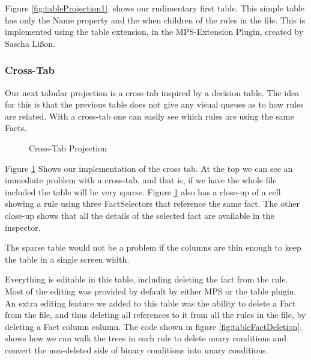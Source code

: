 Figure \ref{fig:tableProjection1}, shows our rudimentary first table.
This simple table has only the Name property and the when children of the rules in the file.
This is implemented using the table extension, in the MPS-Extension Plugin, created by Sascha Lißon.

\subsubsection{Cross-Tab}
Our next tabular projection is a cross-tab inspired by a decision table.
The idea for this is that the previous table does not give any visual queues as to how rules are related.
With a cross-tab one can easily see which rules are using the same Facts.

\begin{figure}[h]
    \centering
    \caption{Cross-Tab Projection}
    \label{fig:crosstabProjection1}
\end{figure}

Figure \ref{fig:crosstabProjection1} Shows our implementation of the cross tab.
At the top we can see an immediate problem with a cross-tab, and that is, if we have the whole file included the table will be very sparse.
Figure \ref{fig:crosstabProjection1} also has a close-up of a cell showing a rule using three FactSelectors that reference the same fact.
The other close-up shows that all the details of the selected fact are available in the inspector.

The sparse table would not be a problem if the columns are thin enough to keep the table in a single screen width.

Everything is editable in this table, including deleting the fact from the rule.
Most of the editing was provided by default by either MPS or the table plugin.
An extra editing feature we added to this table was the ability to delete a Fact from the file, and thus deleting all references to it from all the rules in the file, by deleting a Fact column column.
The code shown in figure \ref{fig:tableFactDeletion}, shows how we can walk the trees in each rule to delete unary conditions and convert the non-deleted side of binary conditions into unary conditions.

